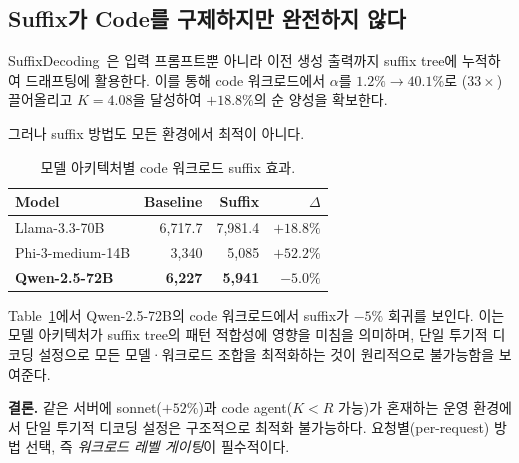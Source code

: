
\subsection{Suffix가 Code를 구제하지만 완전하지 않다}
\label{subsec:mot-suffix-limit}

SuffixDecoding~\cite{snowflake-arctic}은 입력 프롬프트뿐 아니라
이전 생성 출력까지 suffix tree에 누적하여 드래프팅에 활용한다.
이를 통해 code 워크로드에서 $\alpha$를 $1.2\% \to 40.1\%$로
($33\times$) 끌어올리고 $K = 4.08$을 달성하여 $+18.8\%$의 순 양성을 확보한다.

그러나 suffix 방법도 모든 환경에서 최적이 아니다.

\begin{table}[t]
\centering
\caption{모델 아키텍처별 code 워크로드 suffix 효과.}
\label{tbl:suffix-code-arch}
\footnotesize
\begin{tabular}{@{}lrrr@{}}
\toprule
\textbf{Model}       & \textbf{Baseline} & \textbf{Suffix} & \textbf{$\Delta$} \\
\midrule
Llama-3.3-70B        & 6,717.7 & 7,981.4 & $+18.8\%$ \\
Phi-3-medium-14B     & 3,340   & 5,085   & $+52.2\%$ \\
\textbf{Qwen-2.5-72B}& \textbf{6,227}  & \textbf{5,941}  & $\mathbf{-5.0\%}$ \\
\bottomrule
\end{tabular}
\end{table}

Table~\ref{tbl:suffix-code-arch}에서 Qwen-2.5-72B의 code 워크로드에서
suffix가 $-5\%$ 회귀를 보인다.
이는 모델 아키텍처가 suffix tree의 패턴 적합성에 영향을 미침을 의미하며,
단일 투기적 디코딩 설정으로 모든 모델·워크로드 조합을 최적화하는 것이
원리적으로 불가능함을 보여준다.



\textbf{결론.}
같은 서버에 sonnet($+52\%$)과 code agent($K < R$ 가능)가 혼재하는 운영 환경에서
단일 투기적 디코딩 설정은 구조적으로 최적화 불가능하다.
요청별(per-request) 방법 선택, 즉 \emph{워크로드 레벨 게이팅}이 필수적이다.

